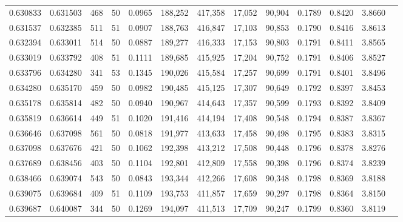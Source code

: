 \begin{tabular}{rrrrrrrrrrrrr}
0.630833 & 0.631503 &   468 &  50 &                                     0.0965 & 188,252 & 417,358 &  17,052 &  90,904 & 0.1789 & 0.8420 & 3.8660 \\
0.631537 & 0.632385 &   511 &  51 &                                     0.0907 & 188,763 & 416,847 &  17,103 &  90,853 & 0.1790 & 0.8416 & 3.8613 \\
0.632394 & 0.633011 &   514 &  50 &                                     0.0887 & 189,277 & 416,333 &  17,153 &  90,803 & 0.1791 & 0.8411 & 3.8565 \\
0.633019 & 0.633792 &   408 &  51 &                                     0.1111 & 189,685 & 415,925 &  17,204 &  90,752 & 0.1791 & 0.8406 & 3.8527 \\
0.633796 & 0.634280 &   341 &  53 &                                     0.1345 & 190,026 & 415,584 &  17,257 &  90,699 & 0.1791 & 0.8401 & 3.8496 \\
0.634280 & 0.635170 &   459 &  50 &                                     0.0982 & 190,485 & 415,125 &  17,307 &  90,649 & 0.1792 & 0.8397 & 3.8453 \\
0.635178 & 0.635814 &   482 &  50 &                                     0.0940 & 190,967 & 414,643 &  17,357 &  90,599 & 0.1793 & 0.8392 & 3.8409 \\
0.635819 & 0.636614 &   449 &  51 &                                     0.1020 & 191,416 & 414,194 &  17,408 &  90,548 & 0.1794 & 0.8387 & 3.8367 \\
0.636646 & 0.637098 &   561 &  50 &                                     0.0818 & 191,977 & 413,633 &  17,458 &  90,498 & 0.1795 & 0.8383 & 3.8315 \\
0.637098 & 0.637676 &   421 &  50 &                                     0.1062 & 192,398 & 413,212 &  17,508 &  90,448 & 0.1796 & 0.8378 & 3.8276 \\
0.637689 & 0.638456 &   403 &  50 &                                     0.1104 & 192,801 & 412,809 &  17,558 &  90,398 & 0.1796 & 0.8374 & 3.8239 \\
0.638466 & 0.639074 &   543 &  50 &                                     0.0843 & 193,344 & 412,266 &  17,608 &  90,348 & 0.1798 & 0.8369 & 3.8188 \\
0.639075 & 0.639684 &   409 &  51 &                                     0.1109 & 193,753 & 411,857 &  17,659 &  90,297 & 0.1798 & 0.8364 & 3.8150 \\
0.639687 & 0.640087 &   344 &  50 &                                     0.1269 & 194,097 & 411,513 &  17,709 &  90,247 & 0.1799 & 0.8360 & 3.8119 \\

\end{tabular}
